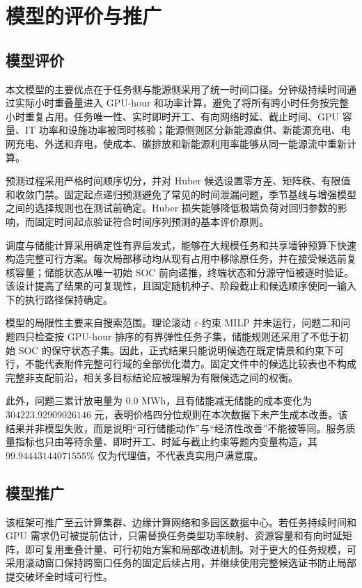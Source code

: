 \section{模型的评价与推广}

\subsection{模型评价}

本文模型的主要优点在于任务侧与能源侧采用了统一时间口径。分钟级持续时间通过实际小时重叠量进入 GPU-hour 和功率计算，避免了将所有跨小时任务按完整小时重复占用。任务唯一性、实时即时开工、有向网络时延、截止时间、GPU 容量、IT 功率和设施功率被同时核验；能源侧则区分新能源直供、新能源充电、电网充电、外送和弃电，使成本、碳排放和新能源利用率能够从同一能源流中重新计算。

预测过程采用严格时间顺序切分，并对 Huber 候选设置零方差、矩阵秩、有限值和收敛门禁。固定起点递归预测避免了常见的时间泄漏问题，季节基线与增强模型之间的选择规则也在测试前确定。Huber 损失能够降低极端负荷对回归参数的影响\cite{huber1964robust}，而固定时间起点验证符合时间序列预测的基本评价原则\cite{hyndman2018forecasting}。

调度与储能计算采用确定性有界启发式，能够在大规模任务和共享墙钟预算下快速构造完整可行方案。每次局部移动均从现有占用中移除原任务，并在接受候选前复核容量；储能状态从唯一初始 SOC 前向递推，终端状态和分源守恒被逐时验证。该设计提高了结果的可复现性，且固定随机种子、阶段截止和候选顺序使同一输入下的执行路径保持确定。

模型的局限性主要来自搜索范围。理论滚动 $\varepsilon$-约束 MILP 并未运行，问题二和问题四只检查按 GPU-hour 排序的有界弹性任务子集，储能规则还采用了不低于初始 SOC 的保守状态子集。因此，正式结果只能说明候选在既定情景和约束下可行，不能代表附件完整可行域的全部优化潜力。固定文件中的候选比较表也不构成完整非支配前沿，相关多目标结论应被理解为有限候选之间的权衡\cite{miettinen1999multiobjective}。

此外，问题三累计放电量为 $0.0$ MWh，且有储能减无储能的成本变化为 $304223.92909026146$ 元，表明价格四分位规则在本次数据下未产生成本改善。该结果并非模型失败，而是说明“可行储能动作”与“经济性改善”不能被等同。服务质量指标也只由等待余量、即时开工、时延与截止约束等题内变量构造，其 $99.94443144071555\%$ 仅为代理值，不代表真实用户满意度。

\subsection{模型推广}

该框架可推广至云计算集群、边缘计算网络和多园区数据中心。若任务持续时间和 GPU 需求仍可被提前估计，只需替换任务类型功率映射、资源容量和有向时延矩阵，即可复用重叠计量、可行初始方案和局部改进机制。对于更大的任务规模，可采用滚动窗口保持跨窗口任务的固定后续占用，并继续使用完整候选证书防止局部提交破坏全时域可行性。

